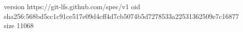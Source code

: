 version https://git-lfs.github.com/spec/v1
oid sha256:568bd5cc1c91ce517e09d4cff4d7cb5074b5d7278533a22531362509e7c16877
size 11068

